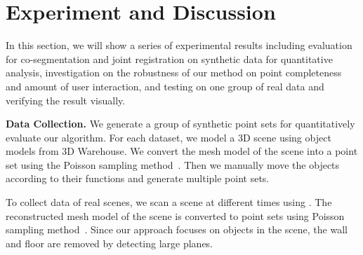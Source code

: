 \section{Experiment and Discussion}
\label{sec:results}
In this section, we will show a series of experimental results including evaluation for co-segmentation and joint registration on synthetic data for quantitative analysis, investigation on the robustness of our method on point completeness and amount of user interaction, and testing on one group of real data and verifying the result visually.

\noindent \textbf{Data Collection.} 
We generate a group of synthetic point sets for quantitatively evaluate our algorithm. 
%
For each dataset, we model a 3D scene using object models from 3D Warehouse. %
We convert the mesh model of the scene into a point set using the Poisson sampling method~\cite{PossionSampling}.
%
Then we manually move the objects according to their functions and generate multiple point sets. 

To collect data of real scenes, we scan a scene at different times using \cite{VXH}.
%
The reconstructed mesh model of the scene is converted to point sets using Poisson sampling method~\cite{PossionSampling}.
% 
Since our approach focuses on objects in the scene, the wall and floor are removed by detecting large planes.

